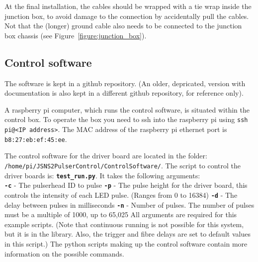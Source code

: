 At the final installation, the cables should be wrapped with a tie wrap inside the junction box, to avoid damage to the connection by accidentally pull the cables. Not that the (longer) ground cable also needs to be connected to the junction box chassis (see Figure~\ref{figure:junction_box}).


\subsection*{Control software}

The software is kept in a  github repository\cite{GITHUB_SOFT}.
(An older, depricated, version with documentation is also kept in a different github repository\cite{GITHUB_TEST}, for reference only).
 
A raspberry pi computer, which runs the control software, is situated within the control box. To operate the box you need to ssh into the raspberry pi using \texttt{ssh pi@<IP address>}. The MAC address of the raspberry pi ethernet port is \texttt{b8:27:eb:ef:45:ee}.

The control software for the driver board are located in the folder: \texttt{/home/pi/JSNS2PulserControl/ControlSoftware/}.
The script to control the driver boards is: \texttt{\textbf{test\_run.py}}.
It takes the following arguments:\\
\newline
\texttt{\textbf{-c}} - The pulserhead ID to pulse \newline
\texttt{\textbf{-p}} - The pulse height for the driver board, this controls the intensity of each LED pulse. (Ranges from 0 to 16384)\newline
\texttt{\textbf{-d}} - The delay between pulses in milliseconds \newline
\texttt{\textbf{-n}} - Number of pulses. The number of pulses must be a multiple of 1000, up to 65,025 \newline
\newline
All arguments are required for this example scripts. (Note that continuous running is not possible for this system, but it is in the library. Also, the trigger and fibre delays are set to default values in this script.) The python scripts making up the control software contain more information on the possible commands.
